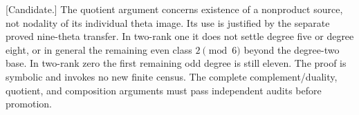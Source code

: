 \begin{remark}
\label{rem:nonordinary-arbitrary-odd-neighbor-scope-candidate}
\textup{[Candidate.]}
The quotient argument concerns existence of a nonproduct source,
not nodality of its individual theta image. Its use is justified
by the separate proved nine-theta transfer. In two-rank one it
does not settle degree five or degree eight, or in general the
remaining even class $2\pmod6$ beyond the degree-two base. In
two-rank zero the first remaining odd degree is still eleven.
The proof is symbolic and invokes no new finite census. The
complete complement/duality, quotient, and composition arguments
must pass independent audits before promotion.
\end{remark}
